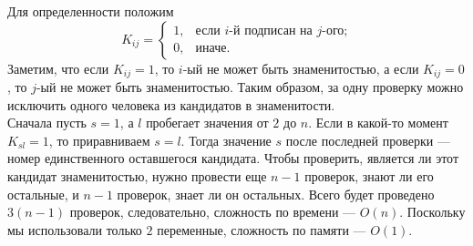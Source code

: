 \documentclass{article}
\begin{document}
Для определенности положим
$$K_{ij} = \begin{cases} 1,&\text{если } i\text{-й подписан на }j\text{-ого;}\\ 0,&\text{иначе.}\end{cases}$$
Заметим, что если $K_{ij} = 1$, то $i$-ый не может быть знаменитостью, а если $K_{ij} = 0$, то $j$-ый не может быть знаменитостью. Таким образом, за 
одну проверку можно исключить одного человека из кандидатов в знаменитости.\\
Сначала пусть $s=1$, а $l$ пробегает значения от $2$ до $n$. Если в какой-то момент $K_{sl}=1$, то приравниваем $s=l$. Тогда значение 
$s$ после последней проверки --- номер единственного оставшегося кандидата. Чтобы проверить, является ли этот кандидат знаменитостью, нужно провести еще 
$n-1$ проверок, знают ли его остальные, и $n-1$ проверок, знает ли он остальных. Всего будет проведено $3(n-1)$ проверок, следовательно, сложность по времени --- $O(n)$. 
Поскольку мы использовали только $2$ переменные, сложность по памяти --- $O(1)$.
\end{document}
